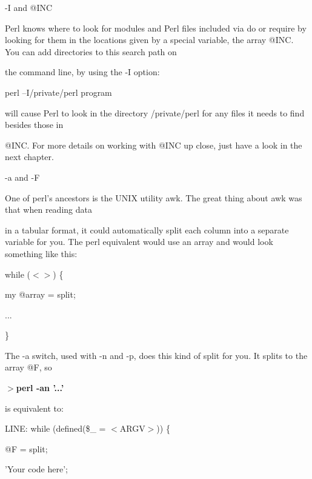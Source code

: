 \documentclass[a4paper,11pt]{book}
\begin{document}
\noindent 

\noindent -I and @INC

\noindent 

\noindent Perl knows where to look for modules and Perl files included via do or require by looking for them in the locations given by a special variable, the array @INC. You can add directories to this search path on

\noindent the command line, by using the -I option:

\noindent 

\noindent 

\noindent perl --I/private/perl program

\noindent 

\noindent will cause Perl to look in the directory /private/perl for any files it needs to find besides those in

\noindent @INC. For more details on working with @INC up close, just have a look in the next chapter.

\noindent 

\noindent -a and -F

\noindent 

\noindent One of perl's ancestors is the UNIX utility awk. The great thing about awk was that when reading data

\noindent in a tabular format, it could automatically split each column into a separate variable for you. The perl equivalent would use an array and would look something like this:

\noindent 

\noindent while ($<$$>$) \{

\noindent my @array = split;

\noindent ...

\noindent \}

\noindent 

\noindent The -a switch, used with -n and -p, does this kind of split for you. It splits to the array @F, so

\noindent 

\noindent $>$\textbf{perl -an '...'}

\noindent 

\noindent is equivalent to:

\noindent 

\noindent LINE: while (defined(\$\_  = $<$ARGV$>$)) \{

\noindent @F = split;

\noindent 'Your code here';
\end{document}

